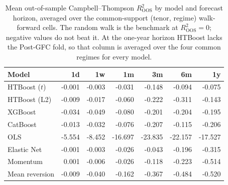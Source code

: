 \begin{table}[htbp]
\centering
\caption{Mean out-of-sample Campbell--Thompson $R^2_{\text{OOS}}$ by model and forecast horizon, averaged over the common-support (tenor, regime) walk-forward cells. The random walk is the benchmark at $R^2_{\text{OOS}}=0$; negative values do not beat it. At the one-year horizon HTBoost lacks the Post-GFC fold, so that column is averaged over the four common regimes for every model.}
\label{tab:oos_horizon}
\footnotesize
\begin{tabular}{lrrrrrr}
\toprule
Model & 1d & 1w & 1m & 3m & 6m & 1y \\
\midrule
HTBoost ($t$) & -0.001 & -0.003 & -0.031 & -0.148 & -0.094 & -0.075 \\
HTBoost (L2) & -0.009 & -0.017 & -0.060 & -0.222 & -0.311 & -0.143 \\
XGBoost & -0.034 & -0.049 & -0.080 & -0.201 & -0.204 & -0.195 \\
CatBoost & -0.013 & -0.032 & -0.076 & -0.207 & -0.115 & -0.206 \\
OLS & -5.554 & -8.452 & -16.697 & -23.835 & -22.157 & -17.527 \\
Elastic Net & -0.001 & -0.003 & -0.026 & -0.043 & -0.196 & -0.315 \\
Momentum & 0.001 & -0.006 & -0.026 & -0.118 & -0.223 & -0.514 \\
Mean reversion & -0.009 & -0.040 & -0.162 & -0.367 & -0.484 & -0.520 \\
\bottomrule
\end{tabular}
\end{table}
